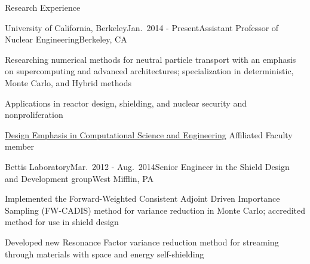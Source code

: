 \documentclass{resume3} %
\begin{document}
\begin{rSection}{Research Experience}
\begin{rSubsection}{University of California, Berkeley}{Jan.\ 2014 - Present}{Assistant Professor of Nuclear Engineering}{Berkeley, CA}
\item Researching numerical methods for neutral particle transport with an emphasis on supercomputing and advanced architectures; specialization in deterministic, Monte Carlo, and Hybrid methods
\item Applications in reactor design, shielding, and nuclear security and nonproliferation
\item \href{http://citris-uc.org/decse-mission/}{Design Emphasis  in Computational Science and Engineering} Affiliated Faculty member
\end{rSubsection}


\begin{rSubsection}{Bettis Laboratory}{Mar.\ 2012 - Aug.\ 2014}{Senior Engineer in the Shield Design and Development group}{West Mifflin, PA}
\item Implemented the Forward-Weighted Consistent Adjoint Driven Importance Sampling (FW-CADIS) method for variance reduction in Monte Carlo; accredited method for use in shield design
\item Developed new Resonance Factor variance reduction method for streaming through materials with space and energy self-shielding
\end{rSubsection}



\end{rSection}
\end{document}
